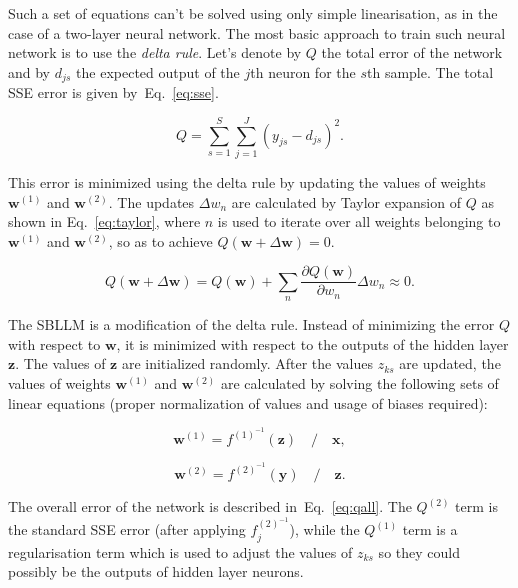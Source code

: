 \documentclass[]{spie}  %
\newcommand{\bm}[1]{\boldsymbol{#1}}
\begin{document}
Such a set of equations can't be solved using only simple linearisation, as in the case of a two-layer neural network. The most basic approach to train such neural network is to use the \emph{delta rule}. Let's denote by $Q$ the total error of the network and by $d_{js}$ the expected output of the $j$th neuron for the $s$th sample. The total SSE error is given by~Eq.~\ref{eq:sse}.

\begin{equation}
Q = \sum_{s=1}^{S} \sum_{j=1}^{J} \left( y_{js}  - d_{js} \right)^{2}.
\label{eq:sse}
\end{equation}

This error is minimized using the delta rule by updating the values of weights $\bm{w}^{(1)}$ and $\bm{w}^{(2)}$. The updates $\Delta w_{n}$ are calculated by Taylor expansion of $Q$ as shown in Eq.~\ref{eq:taylor}, where $n$ is used to iterate over all weights belonging to  $\bm{w}^{(1)}$ and $\bm{w}^{(2)}$, so as to achieve $Q(\bm{w} + \Delta \bm{w}) = 0$.

\begin{equation}
Q(\bm{w} + \Delta \bm{w}) = Q(\bm{w}) + \sum_{n} \frac{\partial Q(\bm{w})}{\partial w_{n}} \Delta w_{n} \approx 0.
\label{eq:taylor}
\end{equation}

The SBLLM is a modification of the delta rule. Instead of minimizing the error $Q$ with respect to $\bm{w}$, it is minimized with respect to the outputs of the hidden layer $\bm{z}$. The values of $\bm{z}$ are initialized randomly. After the values $z_{ks}$ are updated, the values of weights $\bm{w}^{(1)}$ and $\bm{w}^{(2)}$ are calculated by solving the following sets of linear equations (proper normalization of values and usage of biases required):

\begin{equation}
\bm{w}^{(1)} = f^{(1)^{-1}}(\bm{z}) \quad / \quad \bm{x},
\end{equation}

\begin{equation}
\bm{w}^{(2)} = f^{(2)^{-1}}(\bm{y}) \quad / \quad \bm{z}.
\end{equation}

The overall error of the network is described in~Eq.~\ref{eq:qall}. The $Q^{(2)}$ term is the standard SSE error (after applying $f_j^{(2)^{-1}}$), while the $Q^{(1)}$ term is a regularisation term which is used to adjust the values of $z_{ks}$ so they could possibly be the outputs of hidden layer neurons.
\end{document}
